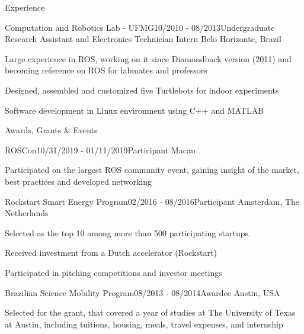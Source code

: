 \documentclass[14pt, a4paper]{resume} %
\begin{document}
\begin{rSection}{Experience}
\begin{rSubsection}{Computation and Robotics Lab - UFMG}{10/2010 - 08/2013}{\normalfont Undergraduate Research Assistant and Electronics Technician Intern}{ \normalfont Belo Horizonte, Brazil}
	\item Large experience in ROS, working on it since Diamondback version (2011) and becoming reference on ROS for labmates and professors
 	\item Designed, assembled and customized five Turtlebots for indoor experiments
 	\item Software development in Linux environment using C++ and MATLAB
 	\newline
 	\newline
 	\newline
 	\newline
\end{rSubsection}
\end{rSection}


\begin{rSection}{Awards, Grants \& Events}
	\begin{rSubsection}{ROSCon}{10/31/2019 - 01/11/2019}{Participant}{ \normalfont Macau}
		\item Participated on the largest ROS community event, gaining insight of the market, best practices and developed networking
	\end{rSubsection}
	
	\begin{rSubsection}{Rockstart Smart Energy Program}{02/2016 - 08/2016}{Participant}{ \normalfont Amsterdam, The Netherlands}
		\item Selected as the top 10 among more than 500 participating startups.
		\item Received investment from a Dutch accelerator (Rockstart)
		\item Participated in pitching competitions and investor meetings
	\end{rSubsection}
	
\begin{rSubsection}{Brazilian Science Mobility Program}{08/2013 - 08/2014}{Awardee}{ \normalfont Austin, USA}
	\item Selected for the grant, that covered a year of studies at The University of Texas at Austin, including tuitions, housing, meals, travel expenses, and internship
\end{rSubsection}

\end{rSection}
\end{document}
